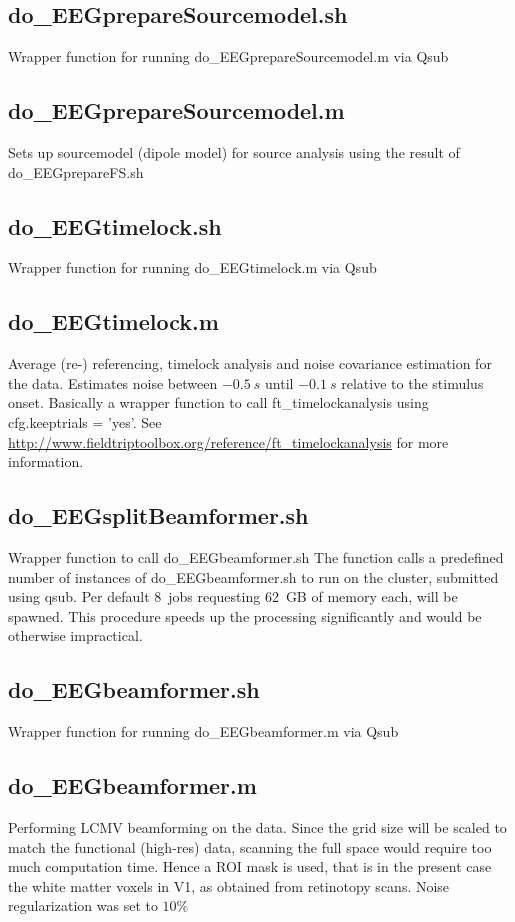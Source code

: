 \documentclass[12pt,a4paper]{scrartcl}
\begin{document}
\subsection{do\_EEGprepareSourcemodel.sh}
\label{sec:prepSM}
Wrapper function for running do\_EEGprepareSourcemodel.m via Qsub

\subsection{do\_EEGprepareSourcemodel.m}
Sets up sourcemodel (dipole model) for source analysis using the result of do\_EEGprepareFS.sh

\subsection{do\_EEGtimelock.sh}
\label{sec:timelock}
Wrapper function for running do\_EEGtimelock.m via Qsub

\subsection{do\_EEGtimelock.m}
Average (re-) referencing, timelock analysis and noise covariance estimation for the data. Estimates noise between $-0.5~s$ until $-0.1~s$ relative to the stimulus onset. Basically a wrapper function to call ft\_timelockanalysis using cfg.keeptrials = 'yes'. See \href{http://www.fieldtriptoolbox.org/reference/ft\_timelockanalysis}{http://www.fieldtriptoolbox.org/reference/ft\_timelockanalysis} for more information.

\subsection{do\_EEGsplitBeamformer.sh}
\label{sec:beamf}
Wrapper function to call do\_EEGbeamformer.sh The function calls a predefined number of instances of do\_EEGbeamformer.sh to run on the cluster, submitted using qsub. Per default 8~jobs requesting 62~GB of memory each, will be spawned. This procedure speeds up the processing significantly and would be otherwise impractical.\\

\subsection{do\_EEGbeamformer.sh}
Wrapper function for running do\_EEGbeamformer.m via Qsub

\subsection{do\_EEGbeamformer.m}
Performing LCMV beamforming on the data. Since the grid size will be scaled to match the functional (high-res) data, scanning the full space would require too much computation time. Hence a ROI mask is used, that is in the present case the white matter voxels in V1, as obtained from retinotopy scans. Noise regularization was set to $10\%$
\end{document}
